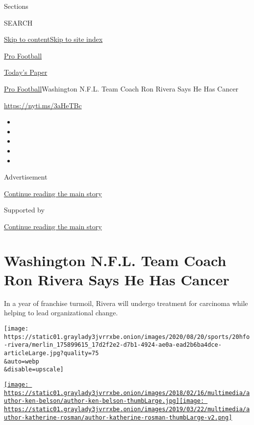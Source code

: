 Sections

SEARCH

\protect\hyperlink{site-content}{Skip to
content}\protect\hyperlink{site-index}{Skip to site index}

\href{https://www.nytimes3xbfgragh.onion/section/sports/football}{Pro
Football}

\href{https://myaccount.nytimes3xbfgragh.onion/auth/login?response_type=cookie\&client_id=vi}{}

\href{https://www.nytimes3xbfgragh.onion/section/todayspaper}{Today's
Paper}

\href{/section/sports/football}{Pro Football}\textbar{}Washington N.F.L.
Team Coach Ron Rivera Says He Has Cancer

\url{https://nyti.ms/3aHeTBc}

\begin{itemize}
\item
\item
\item
\item
\item
\end{itemize}

Advertisement

\protect\hyperlink{after-top}{Continue reading the main story}

Supported by

\protect\hyperlink{after-sponsor}{Continue reading the main story}

\hypertarget{washington-nfl-team-coach-ron-rivera-says-he-has-cancer}{%
\section{Washington N.F.L. Team Coach Ron Rivera Says He Has
Cancer}\label{washington-nfl-team-coach-ron-rivera-says-he-has-cancer}}

In a year of franchise turmoil, Rivera will undergo treatment for
carcinoma while helping to lead organizational change.

\texttt{[image: https://static01.graylady3jvrrxbe.onion/images/2020/08/20/sports/20hfo-rivera/merlin\_175899615\_17d2f2e2-d7b1-4924-ae0a-ead2b6ba4dce-articleLarge.jpg?quality=75\\\&auto=webp\\\&disable=upscale]}

\href{https://www.nytimes3xbfgragh.onion/by/ken-belson}{\texttt{[image: https://static01.graylady3jvrrxbe.onion/images/2018/02/16/multimedia/author-ken-belson/author-ken-belson-thumbLarge.jpg]}}\href{https://www.nytimes3xbfgragh.onion/by/katherine-rosman}{\texttt{[image: https://static01.graylady3jvrrxbe.onion/images/2019/03/22/multimedia/author-katherine-rosman/author-katherine-rosman-thumbLarge-v2.png]}}

